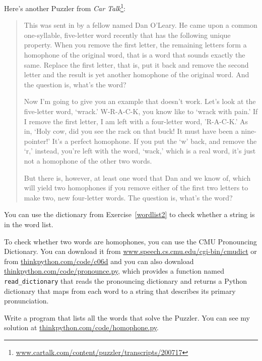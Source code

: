 \documentclass[10pt]{book}
\begin{document}
\begin{ex}

Here's another Puzzler from {\em Car
Talk}\footnote{\url{www.cartalk.com/content/puzzler/transcripts/200717}}:

\begin{quote}
This was sent in by a fellow named Dan O'Leary. He came upon a common
one-syllable, five-letter word recently that has the following unique
property. When you remove the first letter, the remaining letters form
a homophone of the original word, that is a word that sounds exactly
the same. Replace the first letter, that is, put it back and remove
the second letter and the result is yet another homophone of the
original word. And the question is, what's the word?

Now I'm going to give you an example that doesn't work. Let's look at
the five-letter word, `wrack.' W-R-A-C-K, you know like to `wrack with
pain.' If I remove the first letter, I am left with a four-letter
word, 'R-A-C-K.' As in, `Holy cow, did you see the rack on that buck!
It must have been a nine-pointer!' It's a perfect homophone. If you
put the `w' back, and remove the `r,' instead, you're left with the
word, `wack,' which is a real word, it's just not a homophone of the
other two words.

But there is, however, at least one word that Dan and we know of,
which will yield two homophones if you remove either of the first two
letters to make two, new four-letter words. The question is, what's
the word?
\end{quote}


You can use the dictionary from Exercise~\ref{wordlist2} to check
whether a string is in the word list.

To check whether two words are homophones, you can use the CMU
Pronouncing Dictionary.  You can download it from
\url{www.speech.cs.cmu.edu/cgi-bin/cmudict} or from
\url{thinkpython.com/code/c06d} and you can also download
\url{thinkpython.com/code/pronounce.py}, which provides a function
named \verb"read_dictionary" that reads the pronouncing dictionary and
returns a Python dictionary that maps from each word to a string that
describes its primary pronunciation.

Write a program that lists all the words that solve the Puzzler.
You can see my solution at \url{thinkpython.com/code/homophone.py}.

\end{ex}
\end{document}
